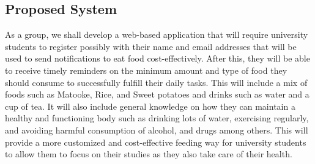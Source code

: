 \documentclass{article}
\begin{document}
\subsection{Proposed System}
As a group, we shall develop a web-based application that will require university students to register possibly with their name and email addresses that will be used to send notifications to eat food cost-effectively. After this, they will be able to receive timely reminders on the minimum amount and type of food they should consume to successfully fulfill their daily tasks. This will include a mix of foods such as Matooke, Rice, and Sweet potatoes and drinks such as water and a cup of tea. It will also include general knowledge on how they can maintain a healthy and functioning body such as drinking lots of water, exercising regularly, and avoiding harmful consumption of alcohol, and drugs among others.
This will provide a more customized and cost-effective feeding way for university students to allow them to focus on their studies as they also take care of their health.
\end{document}
